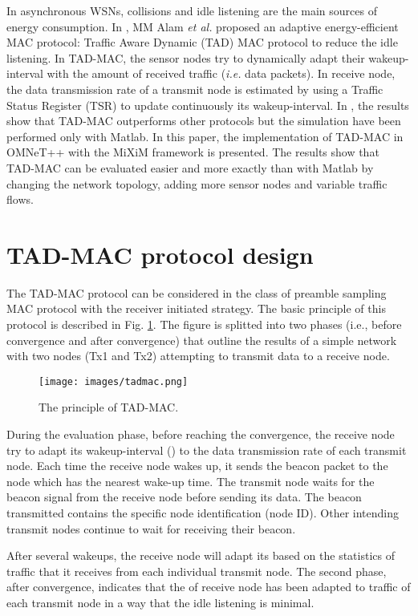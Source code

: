 \documentclass[conference]{IEEEtran}
\begin{document}
In asynchronous WSNs, collisions and idle listening are the main sources of energy consumption. In \cite{AlamBMS12}, MM Alam \textit{et al.} proposed an adaptive energy-efficient MAC protocol: Traffic Aware Dynamic (TAD) MAC protocol to reduce the idle listening. In TAD-MAC, the sensor nodes try to dynamically adapt their wakeup-interval  with the amount of received traffic (\textit{i.e.} data packets). In receive node, the data transmission rate of a transmit node is estimated by using a Traffic Status Register (TSR) to update continuously its wakeup-interval. In \cite{AlamBMS12}, the results show that TAD-MAC outperforms other protocols but the simulation have been performed only with Matlab. In this paper, the implementation of TAD-MAC in OMNeT++ with the MiXiM framework is presented. The results show that TAD-MAC can be evaluated easier and more exactly than with Matlab by changing the network topology, adding more sensor nodes and variable traffic flows.

\section{TAD-MAC protocol design}
\label{sec:protocol}
The TAD-MAC protocol can be considered in the class of preamble sampling MAC protocol with the receiver initiated strategy. The basic principle of this protocol is described in Fig. \ref{fig:tadmac}. The figure is splitted into two phases (i.e., before convergence and after convergence) that outline the results of a simple network with two nodes (Tx1 and Tx2) attempting to transmit data to a receive node.

\begin{figure}[!t]
\centering
\texttt{[image: images/tadmac.png]}
\caption{The principle of TAD-MAC.}
\label{fig:tadmac}
\end{figure}

During the evaluation phase, before reaching the convergence, the receive node try to adapt its wakeup-interval () to the data transmission rate of each transmit node. Each time the receive node wakes up, it sends the beacon packet to the node which has the nearest wake-up time. The transmit node waits for the beacon signal from the receive node before sending its data. The beacon transmitted contains the specific node identification (node ID). Other intending transmit nodes continue to wait for receiving their beacon.

After several wakeups, the receive node will adapt its  based on the statistics of traffic that it receives from each individual transmit node. The second phase, after convergence, indicates that the  of receive node has been adapted to traffic of each transmit node in a way that the idle listening is minimal.
 
\end{document}
